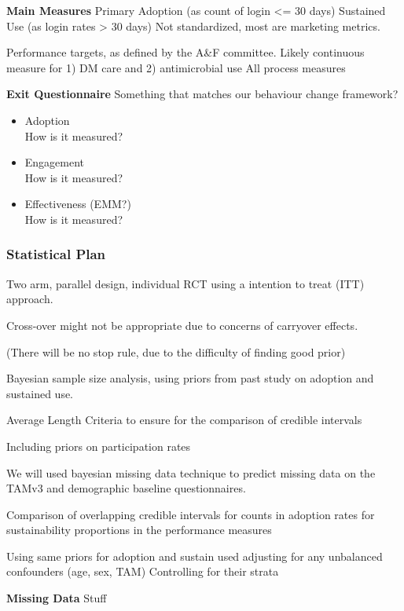 \textbf{Main Measures}
Primary
Adoption (as count of login <= 30 days)
Sustained Use (as login rates > 30 days)
Not standardized, most are marketing metrics.

Performance targets, as defined by the A\&F committee.
Likely continuous measure for 1) DM care and 2) antimicrobial use
All process measures

\textbf{Exit Questionnaire}
Something that matches our behaviour change framework?


\begin{itemize}
    \item Adoption \\ How is it measured?
    \item Engagement \\ How is it measured?
    \item Effectiveness (EMM?) \\ How is it measured?
\end{itemize}

\subsubsection{Statistical Plan}

Two arm, parallel design, individual RCT using a intention to treat (ITT) approach.

Cross-over might not be appropriate due to concerns of carryover effects.

(There will be no stop rule, due to the difficulty of finding good prior)

Bayesian sample size analysis, using priors from past study on adoption and sustained use.

Average Length Criteria to ensure for the comparison of credible intervals

Including priors on participation rates

We will used bayesian missing data technique to predict missing data on the TAMv3 and demographic baseline questionnaires.

Comparison of overlapping credible intervals for 
	counts in adoption 
	rates for sustainability
	proportions in the performance measures

Using same priors for adoption and sustain used
adjusting for any unbalanced confounders (age, sex, TAM)
Controlling for their strata

\textbf{Missing Data}
Stuff

